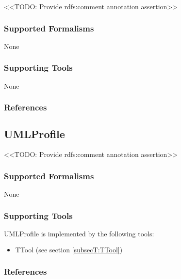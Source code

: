 
<<TODO: Provide rdfs:comment annotation assertion>>

\subsubsection{Supported Formalisms}

None


\subsubsection{Supporting Tools}

None


\subsubsection{References}





\subsection{UMLProfile}
\label{subsecL:UMLProfile}

<<TODO: Provide rdfs:comment annotation assertion>>

\subsubsection{Supported Formalisms}

None


\subsubsection{Supporting Tools}

UMLProfile is implemented by the following tools:
\begin{itemize}
	\item TTool (see section \ref{subsecT:TTool})
\end{itemize}


\subsubsection{References}





